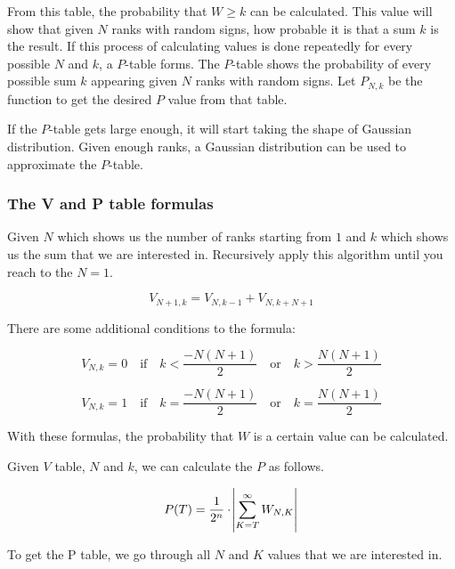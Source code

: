 \documentclass[12pt]{article}
\begin{document}
{From this table, the probability that $W\geq k$ can be calculated. This value will show that given $N$ ranks with random signs, how probable it is that a sum $k$ is the result. If this process of calculating values is done repeatedly for every possible $N$ and $k$, a $P$-table forms. The $P$-table shows the probability of every possible sum $k$ appearing given $N$ ranks with random signs. Let $P_{N, k}$ be the function to get the desired $P$ value from that table.

If the $P$-table gets large enough, it will start taking the shape of Gaussian distribution. Given enough ranks, a Gaussian distribution can be used to approximate the $P$-table.

\subsubsection{The V and P table formulas}
\label{sec:v_p_table_formulas}

Given $N$ which shows us the number of ranks starting from $1$ and $k$ which shows us the sum that we are interested in. Recursively apply this algorithm until you reach to the $N = 1$.

\begin{equation}
  V_{N+1, k} = V_{N, k-1} + V_{N, k+N+1}
\end{equation}

There are some additional conditions to the formula:

\begin{equation}
V_{N, k} = 0  \quad\text{if}\quad k <  \frac{-N(N+1)}{2} \quad\text{or}\quad k >  \frac{N(N+1)}{2}
\end{equation}

\begin{equation}
V_{N, k} = 1 \quad\text{if}\quad k =  \frac{ -N(N+1)}{2} \quad\text{or}\quad k =  \frac{N(N+1)}{2}
\end{equation}

With these formulas, the probability that $W$ is a certain value can be calculated.

Given $V$ table, $N$ and $k$, we can calculate the $P$ as follows.

\begin{equation}
P(T) = \frac{1}{2^n} \cdot \abs{\sum\limits_{K=T}^{\infty}{W_{N,K}}}
\end{equation}

To get the P table, we go through all $N$ and $K$ values that we are interested in.

}
\end{document}
